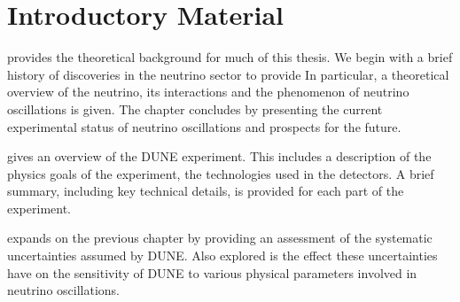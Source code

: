 \chapter{Introductory Material}
\label{sec:intro}

 provides the theoretical background for much of this thesis.
We begin with a brief history of discoveries in the neutrino sector to provide
In particular, a theoretical overview of the neutrino, its interactions and the phenomenon of neutrino oscillations is given.
The chapter concludes by presenting the current experimental status of neutrino oscillations and prospects for the future.

 gives an overview of the DUNE experiment. 
This includes a description of the physics goals of the experiment, the technologies used in the detectors. 
A brief summary, including key technical details, is provided for each part of the experiment.

 expands on the previous chapter by providing an assessment of the systematic uncertainties assumed by DUNE.
Also explored is the effect these uncertainties have on the sensitivity of DUNE to various physical parameters involved in neutrino oscillations.

